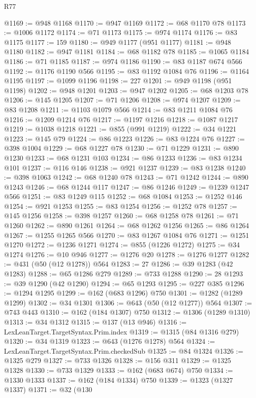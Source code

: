 \begin{lexlean}{R77}
\begin{coremodule}
{{@1169 := @948 @1168
@1170 := @947 @1169
@1172 := @68 @1170 @78
@1173 := @1006 @1172
@1174 := @71 @1173
@1175 := @974 @1174
@1176 := @83 @1175
@1177 := 159
@1180 := @949 @1177 (@951 @1177)
@1181 := @948 @1180
@1182 := @947 @1181
@1184 := @68 @1182 @78
@1185 := @1065 @1184
@1186 := @71 @1185
@1187 := @974 @1186
@1190 := @83 @1187 @674 @566
@1192 := @1176 @1190 @566
@1195 := @83 @1192 @1084 @76
@1196 := @1164 @1195
@1197 := @1099 @1196
@1198 := 227
@1201 := @949 @1198 (@951 @1198)
@1202 := @948 @1201
@1203 := @947 @1202
@1205 := @68 @1203 @78
@1206 := @145 @1205
@1207 := @71 @1206
@1208 := @974 @1207
@1209 := @83 @1208
@1211 := @1103 @1079 @566
@1214 := @83 @1211 @1084 @76
@1216 := @1209 @1214 @76
@1217 := @1197 @1216
@1218 := @1087 @1217
@1219 := @1038 @1218
@1221 := @855 (@991 @1219)
@1222 := @34 @1221
@1223 := @145 @79
@1224 := @86 @1223
@1226 := @83 @1224 @76
@1227 := @398 @1004
@1229 := @68 @1227 @78
@1230 := @71 @1229
@1231 := @890 @1230
@1233 := @68 @1231 @103
@1234 := @86 @1233
@1236 := @83 @1234 @101
@1237 := @116 @146
@1238 := @921 @1237
@1239 := @83 @1238
@1240 := @398 @1063
@1242 := @68 @1240 @78
@1243 := @71 @1242
@1244 := @890 @1243
@1246 := @68 @1244 @117
@1247 := @86 @1246
@1249 := @1239 @1247 @566
@1251 := @83 @1249 @115
@1252 := @68 @1084
@1253 := @1252 @146
@1254 := @921 @1253
@1255 := @83 @1254
@1256 := @1252 @78
@1257 := @145 @1256
@1258 := @398 @1257
@1260 := @68 @1258 @78
@1261 := @71 @1260
@1262 := @890 @1261
@1264 := @68 @1262 @1256
@1265 := @86 @1264
@1267 := @1255 @1265 @566
@1270 := @83 @1267 @1084 @76
@1271 := @1251 @1270
@1272 := @1236 @1271
@1274 := @855 (@1226 @1272)
@1275 := @34 @1274
@1276 := @10 @946
@1277 := @1276 @20
@1278 := @1276 @1277
@1282 := @431 (@50 (@12 @1278)) @564
@1283 := 27
@1286 := @39 @1283 (@42 @1283)
@1288 := @65 @1286 @279
@1289 := @733 @1288
@1290 := 28
@1293 := @39 @1290 (@42 @1290)
@1294 := @65 @1293
@1295 := @227 @385
@1296 := @1294 @1295
@1299 := @162 (@683 @1296) @750
@1301 := @1282 (@1289 @1299)
@1302 := @34 @1301
@1306 := @643 (@50 (@12 @1277)) @564
@1307 := @743 @443
@1310 := @162 (@184 @1307) @750
@1312 := @1306 (@1289 @1310)
@1313 := @34 @1312
@1315 := @137 (@13 @946)
@1316 := LexLeanTarget.TargetSyntax.Prim.index
@1319 := @1315 (@84 @1316 @279)
@1320 := @34 @1319
@1323 := @643 (@1276 @1278) @564
@1324 := LexLeanTarget.TargetSyntax.Prim.checkedSub
@1325 := @84 @1324
@1326 := @1325 @279
@1327 := @733 @1326
@1328 := @156 @311
@1329 := @1325 @1328
@1330 := @733 @1329
@1333 := @162 (@683 @674) @750
@1334 := @1330 @1333
@1337 := @162 (@184 @1334) @750
@1339 := @1323 (@1327 @1337)
@1371 := @32
    (@130
}}
\end{coremodule}
\end{lexlean}
